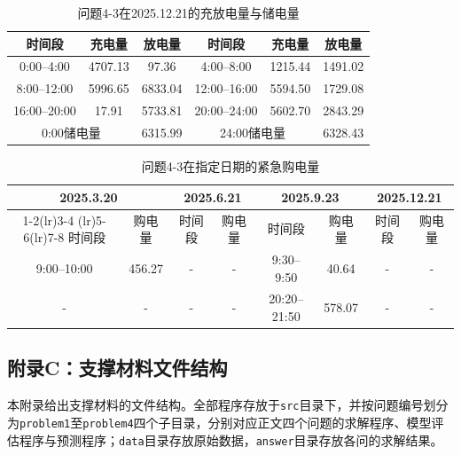 \documentclass[UTF8]{ctexart}
\begin{document}
    \begin{table}[htbp]
        \centering
        \caption{问题4-3在2025.12.21的充放电量与储电量}
        \label{tab:q43_battery_1221}
        \begin{tabular}{cccccc}
            \toprule
            时间段 & 充电量 & 放电量 & 时间段 & 充电量 & 放电量 \\
            \midrule
            0:00--4:00 & 4707.13 & 97.36 & 4:00--8:00 & 1215.44 & 1491.02 \\
            8:00--12:00 & 5996.65 & 6833.04 & 12:00--16:00 & 5594.50 & 1729.08 \\
            16:00--20:00 & 17.91 & 5733.81 & 20:00--24:00 & 5602.70 & 2843.29 \\
            \midrule
            \multicolumn{2}{c}{0:00储电量} & 6315.99 &
            \multicolumn{2}{c}{24:00储电量} & 6328.43 \\
            \bottomrule
        \end{tabular}
    \end{table}
    
    \begin{table}[htbp]
        \centering
        \caption{问题4-3在指定日期的紧急购电量}
        \label{tab:q43_emergency}
        \begin{tabular}{cccccccc}
            \toprule
            \multicolumn{2}{c}{2025.3.20} &
            \multicolumn{2}{c}{2025.6.21} &
            \multicolumn{2}{c}{2025.9.23} &
            \multicolumn{2}{c}{2025.12.21} \\
            \cmidrule(lr){1-2}\cmidrule(lr){3-4}
            \cmidrule(lr){5-6}\cmidrule(lr){7-8}
            时间段 & 购电量 & 时间段 & 购电量 &
            时间段 & 购电量 & 时间段 & 购电量 \\
            \midrule
            9:00--10:00 & 456.27 & - & - & 9:30--9:50 & 40.64 & - & - \\
            - & - & - & - & 20:20--21:50 & 578.07 & - & - \\
            \bottomrule
        \end{tabular}
    \end{table}
    \clearpage
    \subsection*{附录C：支撑材料文件结构}
    
    本附录给出支撑材料的文件结构。全部程序存放于\texttt{src}目录下，并按问题编号划分为\texttt{problem1}至\texttt{problem4}四个子目录，分别对应正文四个问题的求解程序、模型评估程序与预测程序；\texttt{data}目录存放原始数据，\texttt{answer}目录存放各问的求解结果。\par
    
\end{document}
